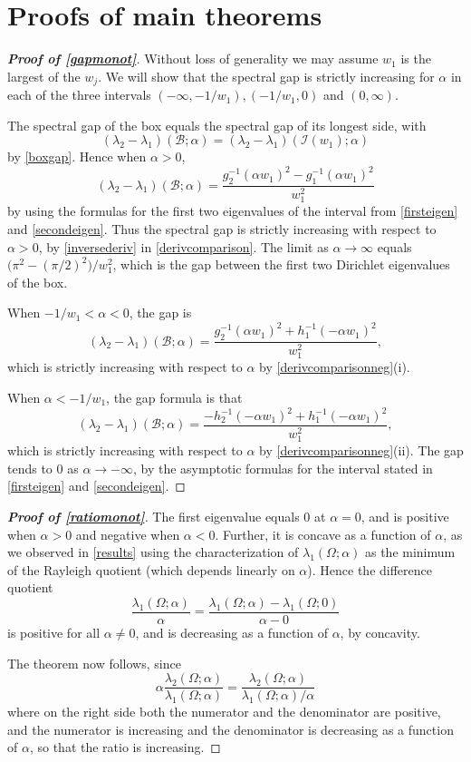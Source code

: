\documentclass[12pt,reqno]{amsart}
\theoremstyle{definition}
\begin{document}
\section{\bf Proofs of main theorems}
\label{mainproofs}
%
\begin{proof}[\bf Proof of \autoref{gapmonot}]
Without loss of generality we may assume $w_1$ is the largest of the $w_j$. We will show that the spectral gap is strictly increasing for $\alpha$ in each of the three intervals $(-\infty,-1/{w_1}), (-1/{w_1},0)$ and $(0,\infty)$. 

The spectral gap of the box equals the spectral gap of its longest side, with
\[
(\lambda_2-\lambda_1)(\mathcal{B};\alpha) = (\lambda_2-\lambda_1)(\mathcal{I}(w_1);\alpha)
\]
by \autoref{boxgap}. Hence when $\alpha>0$, 
\[
(\lambda_2-\lambda_1)(\mathcal{B};\alpha) = \frac{g_2^{-1}(\alpha {w_1})^2 - g_1^{-1}(\alpha {w_1})^2}{w_1^2} 
\]
by using the formulas for the first two eigenvalues of the interval from \autoref{firsteigen} and \autoref{secondeigen}. 
Thus the spectral gap is strictly increasing with respect to $\alpha>0$, by \eqref{inversederiv} in \autoref{derivcomparison}. The limit as $\alpha \to \infty$ equals $\big(\pi^2 - (\pi/2)^2\big)/w_1^2$,
which is the gap between the first two Dirichlet eigenvalues of the box. 

When $-1/{w_1}<\alpha<0$, the gap is
\[
(\lambda_2-\lambda_1)(\mathcal{B};\alpha) = \frac{g_2^{-1}(\alpha {w_1})^2 + h_1^{-1}(-\alpha {w_1})^2}{w_1^2} ,
\]
which is strictly increasing with respect to $\alpha$ by \autoref{derivcomparisonneg}(i). 

When $\alpha<-1/{w_1}$, the gap formula is that 
\[
(\lambda_2-\lambda_1)(\mathcal{B};\alpha) = \frac{-h_2^{-1}(-\alpha {w_1})^2 + h_1^{-1}(-\alpha {w_1})^2}{w_1^2} ,
\]
which is strictly increasing with respect to $\alpha$ by \autoref{derivcomparisonneg}(ii). The gap tends to $0$ as $\alpha \to -\infty$, by the asymptotic formulas for the interval stated in \autoref{firsteigen} and \autoref{secondeigen}. 
\end{proof}
%


%
\begin{proof}[\bf Proof of \autoref{ratiomonot}]
The first eigenvalue equals $0$ at $\alpha=0$, and is positive when $\alpha>0$ and negative when $\alpha<0$. 
Further, it is concave as a function of $\alpha$, as we observed in \autoref{results} using the characterization of $\lambda_1(\Omega;\alpha)$ as the minimum of the Rayleigh quotient (which  depends linearly on $\alpha$). Hence the difference quotient 
\[
\frac{\lambda_1(\Omega;\alpha)}{\alpha} = \frac{\lambda_1(\Omega;\alpha)-\lambda_1(\Omega;0)}{\alpha-0} 
\]
is positive for all $\alpha \neq 0$, and is decreasing as a function of $\alpha$, by concavity.

The theorem now follows, since 
\[
\alpha \frac{\lambda_2(\Omega;\alpha)}{\lambda_1(\Omega;\alpha)} = \frac{\lambda_2(\Omega;\alpha)}{\lambda_1(\Omega;\alpha)/\alpha} 
\]
where on the right side both the numerator and the denominator are positive, and the numerator is increasing and the denominator is decreasing as a function of $\alpha$, so that the ratio is increasing. 
\end{proof}
\end{document}
